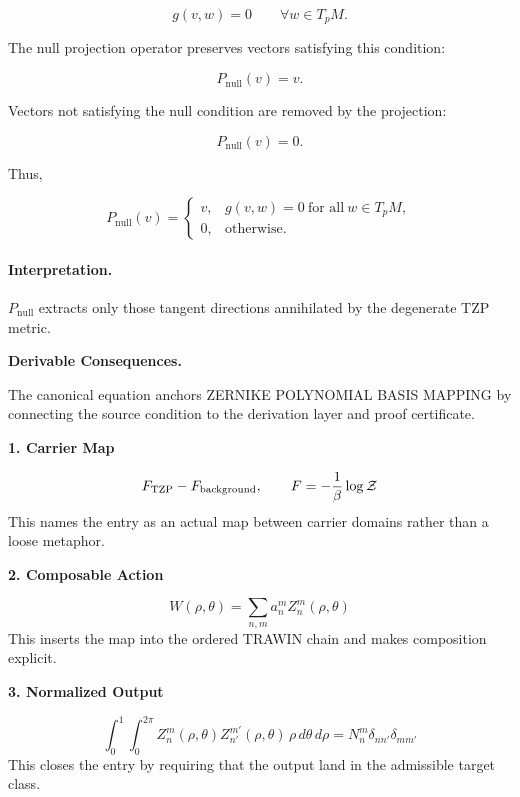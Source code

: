 \begin{equation}
g(v,w)=0
\qquad
\forall w\in T_pM .
\end{equation}

The null projection operator preserves vectors satisfying this condition:

\begin{equation}
P_{\mathrm{null}}(v)=v .
\end{equation}

Vectors not satisfying the null condition are removed by the projection:

\begin{equation}
P_{\mathrm{null}}(v)=0 .
\end{equation}

Thus,

\begin{equation}
\boxed{
P_{\mathrm{null}}(v)
=
\begin{cases}
v, & g(v,w)=0\ \text{for all}\ w\in T_pM,\\
0, & \text{otherwise}.
\end{cases}
}
\end{equation}

\paragraph{Interpretation.}
$P_{\mathrm{null}}$ extracts only those tangent directions annihilated by the degenerate TZP metric.

\par\vspace{0.35em}
\noindent\textbf{Derivable Consequences.}\quad
\begingroup
\footnotesize
\raggedright
The canonical equation anchors ZERNIKE POLYNOMIAL BASIS MAPPING by connecting the source condition to the derivation layer and proof certificate.
\par\endgroup

\noindent\textbf{1. Carrier Map}\par
\[
F_{\rm TZP} - F_{\rm background}, \qquad F=-\frac{1}{\beta}\log\mathcal Z
\]
\noindent This names the entry as an actual map between carrier domains rather than a loose metaphor.\par
\noindent\textbf{2. Composable Action}\par
\[
W(\rho,\theta)=\sum_{n,m} a_n^m Z_n^m(\rho,\theta)
\]
\noindent This inserts the map into the ordered TRAWIN chain and makes composition explicit.\par
\noindent\textbf{3. Normalized Output}\par
\[
\int_{0}^{1}\int_{0}^{2\pi}
Z_n^m(\rho,\theta)Z_{n'}^{m'}(\rho,\theta)\,\rho\,d\theta\,d\rho
=N_n^m\delta_{nn'}\delta_{mm'}
\]
\noindent This closes the entry by requiring that the output land in the admissible target class.\par

